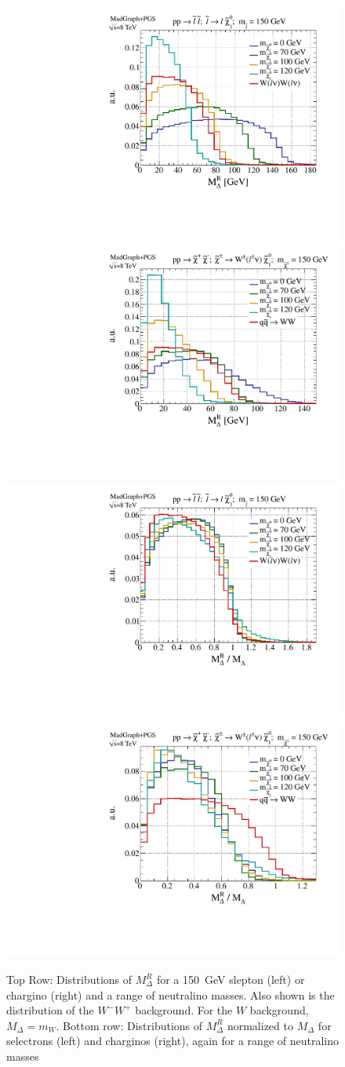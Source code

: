\begin{figure}[ht]
\includegraphics[width=0.35\columnwidth]{fig/sectionII/Mdelta_1D_slepton.pdf}
\includegraphics[width=0.35\columnwidth]{fig/sectionII/Mdelta_1D_chargino.pdf}
\includegraphics[width=0.35\columnwidth]{fig/sectionII/Mdelta_norm_1D_slepton.pdf}
\includegraphics[width=0.35\columnwidth]{fig/sectionII/Mdelta_norm_1D_chargino.pdf}
\caption{Top Row: Distributions of $M_\Delta^R$ for a 150~GeV slepton (left) or chargino (right) and a range of neutralino masses. Also shown is the distribution of the $W^-W^+$ background. For the $W$ background, $M_\Delta = m_W$. Bottom row: Distributions of $M_\Delta^R$ normalized to $M_\Delta$ for selectrons (left) and charginos (right), again for a range of neutralino masses  \label{fig:compare_mdelta}}
\end{figure}

